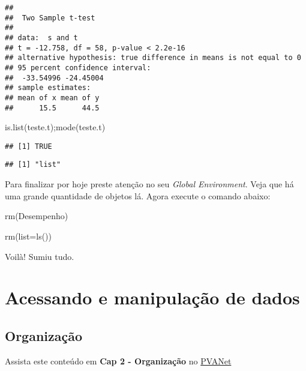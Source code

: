\documentclass[
]{book}
\newenvironment{Shaded}{\begin{snugshade}}{\end{snugshade}}
\newcommand{\AttributeTok}[1]{\textcolor[rgb]{0.77,0.63,0.00}{#1}}
\newcommand{\FunctionTok}[1]{\textcolor[rgb]{0.00,0.00,0.00}{#1}}
\newcommand{\NormalTok}[1]{#1}
\begin{document}
\begin{verbatim}
## 
##  Two Sample t-test
## 
## data:  s and t
## t = -12.758, df = 58, p-value < 2.2e-16
## alternative hypothesis: true difference in means is not equal to 0
## 95 percent confidence interval:
##  -33.54996 -24.45004
## sample estimates:
## mean of x mean of y 
##      15.5      44.5
\end{verbatim}

\begin{Shaded}
\begin{Highlighting}[]
\FunctionTok{is.list}\NormalTok{(teste.t);}\FunctionTok{mode}\NormalTok{(teste.t)}
\end{Highlighting}
\end{Shaded}

\begin{verbatim}
## [1] TRUE
\end{verbatim}

\begin{verbatim}
## [1] "list"
\end{verbatim}

Para finalizar por hoje preste atenção no seu \emph{Global Environment}.
Veja que há uma grande quantidade de objetos lá. Agora execute o comando abaixo:

\begin{Shaded}
\begin{Highlighting}[]
\FunctionTok{rm}\NormalTok{(Desempenho)}

\FunctionTok{rm}\NormalTok{(}\AttributeTok{list=}\FunctionTok{ls}\NormalTok{())}
\end{Highlighting}
\end{Shaded}

Voilà! Sumiu tudo.

\hypertarget{acessando-e-manipulauxe7uxe3o-de-dados}{%
\chapter{Acessando e manipulação de dados}\label{acessando-e-manipulauxe7uxe3o-de-dados}}

\hypertarget{organizauxe7uxe3o}{%
\section{Organização}\label{organizauxe7uxe3o}}

Assista este conteúdo em \textbf{Cap 2 - Organização} no \href{https://www2.cead.ufv.br/sistemas/pvanet/geral/login.php}{PVANet}
\end{document}
